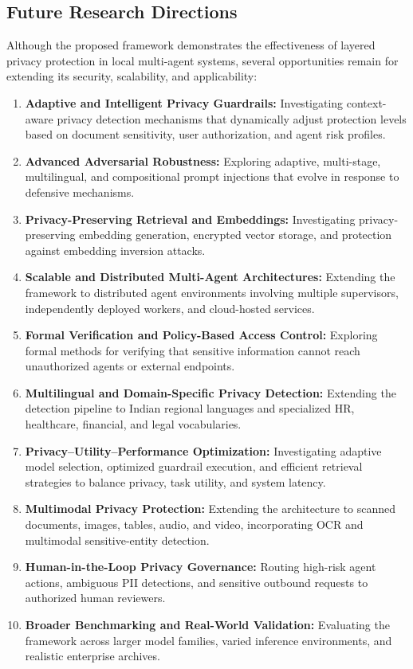 \documentclass[11pt,a4paper]{article}
\begin{document}
\subsection{Future Research Directions}
Although the proposed framework demonstrates the effectiveness of layered privacy protection in local multi-agent systems, several opportunities remain for extending its security, scalability, and applicability:
\begin{enumerate}
    \item \textbf{Adaptive and Intelligent Privacy Guardrails:} Investigating context-aware privacy detection mechanisms that dynamically adjust protection levels based on document sensitivity, user authorization, and agent risk profiles.
    \item \textbf{Advanced Adversarial Robustness:} Exploring adaptive, multi-stage, multilingual, and compositional prompt injections that evolve in response to defensive mechanisms.
    \item \textbf{Privacy-Preserving Retrieval and Embeddings:} Investigating privacy-preserving embedding generation, encrypted vector storage, and protection against embedding inversion attacks.
    \item \textbf{Scalable and Distributed Multi-Agent Architectures:} Extending the framework to distributed agent environments involving multiple supervisors, independently deployed workers, and cloud-hosted services.
    \item \textbf{Formal Verification and Policy-Based Access Control:} Exploring formal methods for verifying that sensitive information cannot reach unauthorized agents or external endpoints.
    \item \textbf{Multilingual and Domain-Specific Privacy Detection:} Extending the detection pipeline to Indian regional languages and specialized HR, healthcare, financial, and legal vocabularies.
    \item \textbf{Privacy--Utility--Performance Optimization:} Investigating adaptive model selection, optimized guardrail execution, and efficient retrieval strategies to balance privacy, task utility, and system latency.
    \item \textbf{Multimodal Privacy Protection:} Extending the architecture to scanned documents, images, tables, audio, and video, incorporating OCR and multimodal sensitive-entity detection.
    \item \textbf{Human-in-the-Loop Privacy Governance:} Routing high-risk agent actions, ambiguous PII detections, and sensitive outbound requests to authorized human reviewers.
    \item \textbf{Broader Benchmarking and Real-World Validation:} Evaluating the framework across larger model families, varied inference environments, and realistic enterprise archives.
\end{enumerate}
\end{document}
